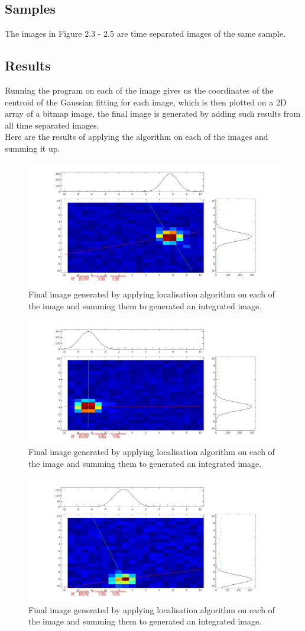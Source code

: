 \documentclass[paper=a4, fontsize=11pt]{scrartcl}
\numberwithin{equation}{section}		%
\numberwithin{figure}{section}			%
\numberwithin{table}{section}				%
\begin{document}
\subsection{Samples}
The images in Figure 2.3 - 2.5 are time separated images of the same sample.

\subsection{Results}
Running the program on each of the image gives us the coordinates of the centroid of the Gaussian fitting for each image, which is then plotted on a 2D array of a bitmap image, the final image is generated by adding such results from all time separated images.\\
Here are the results of applying the algorithm on each of the images and summing it up.

\begin{figure}[h]
\centering
\includegraphics[width=.5\textwidth]{result1}
\caption{Final image generated by applying localisation algorithm on each of the image and summing them to generated an integrated image. }
\end{figure}

\begin{figure}[h]
\centering
\includegraphics[width=.5\textwidth]{result2}
\caption{Final image generated by applying localisation algorithm on each of the image and summing them to generated an integrated image. }
\end{figure}

\begin{figure}[h]
\centering
\includegraphics[width=.5\textwidth]{result3}
\caption{Final image generated by applying localisation algorithm on each of the image and summing them to generated an integrated image. }
\end{figure}
\end{document}
